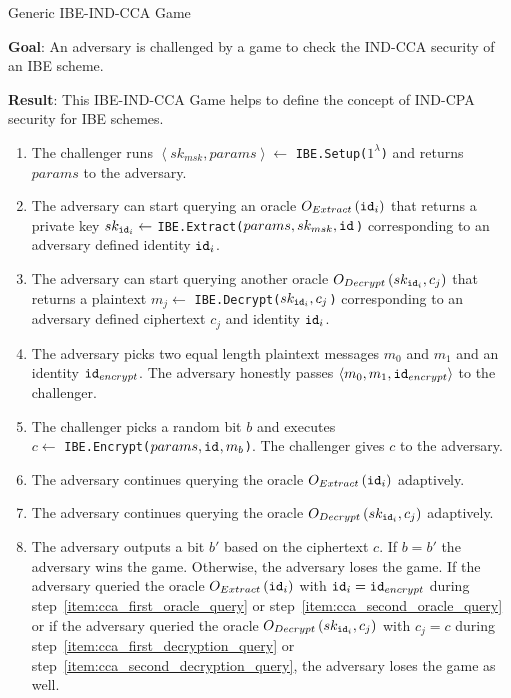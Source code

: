 \begin{game}
\caption{Generic IBE-IND-CCA Game~\cite{thesis:Alfredo08}}
\label{game:ind_cca_game}
\begin{description}
 \item \textbf{Goal}: An adversary is challenged by a game to check the IND-CCA security of an IBE scheme.
 
 \item \textbf{Result}: This IBE-IND-CCA Game helps to define the concept of IND-CPA security for IBE schemes.
\end{description}

 \begin{enumerate}
  \item The challenger runs $\left< sk_{msk}, params\right> \leftarrow$ \texttt{IBE.Setup($1^{\lambda}$)} and returns $params$ to the adversary.
  \item \label{item:cca_first_oracle_query} The adversary can start querying an oracle $O_{Extract} \left( \mathtt{id}_{i} \right)$ that returns a private key $sk_{\mathtt{id}_{i}} \leftarrow$ \texttt{IBE.Extract($params, sk_{msk}, \mathtt{id}_{}$)} corresponding to an adversary defined identity $\mathtt{id}_{i}$.
  \item \label{item:cca_first_decryption_query} The adversary can start querying another oracle $O_{Decrypt} \left( sk_{\mathtt{id}_{i}}, c_j \right)$ that returns a plaintext $m_j \leftarrow$ \texttt{IBE.Decrypt($sk_{\mathtt{id}_{i}}, c_j$)} corresponding to an adversary defined ciphertext $c_j$ and identity $\mathtt{id}_{i}$.
  \item The adversary picks two equal length plaintext messages $m_0$ and $m_1$ and an identity $\mathtt{id}_{encrypt}$. The adversary honestly passes $\left< m_0, m_1, \mathtt{id}_{encrypt} \right>$ to the challenger.
  \item The challenger picks a random bit $b$ and executes \\ $c \leftarrow$ \texttt{IBE.Encrypt($params, \mathtt{id}_{}, m_b$)}. The challenger gives $c$ to the adversary.
  \item \label{item:cca_second_oracle_query} The adversary continues querying the oracle $O_{Extract} \left( \mathtt{id}_{i} \right)$ adaptively.
  \item \label{item:cca_second_decryption_query} The adversary continues querying the oracle $O_{Decrypt} \left( sk_{\mathtt{id}_{i}}, c_j \right)$ adaptively.
  \item The adversary outputs a bit $b'$ based on the ciphertext $c$. If $b = b'$ the adversary wins the game. Otherwise, the adversary loses the game. If the adversary queried the oracle $O_{Extract} \left( \mathtt{id}_{i} \right)$ with $\mathtt{id}_{i} = \mathtt{id}_{encrypt}$ during step~\ref{item:cca_first_oracle_query} or step~\ref{item:cca_second_oracle_query} or if the adversary queried the oracle $O_{Decrypt} \left( sk_{\mathtt{id}_{i}}, c_j \right)$ with $c_j = c$ during step~\ref{item:cca_first_decryption_query} or step~\ref{item:cca_second_decryption_query}, the adversary loses the game as well.
 \end{enumerate}
\end{game}

